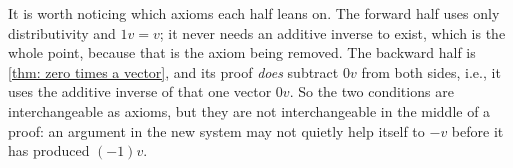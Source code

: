 \begin{ainote}
  It is worth noticing which axioms each half leans on. The forward half uses only distributivity and $1v = v$; it never needs an additive inverse to exist, which is the whole point, because that is the axiom being removed. The backward half is \ref{thm: zero times a vector}, and its proof \emph{does} subtract $0v$ from both sides, i.e., it uses the additive inverse of that one vector $0v$. So the two conditions are interchangeable as axioms, but they are not interchangeable in the middle of a proof: an argument in the new system may not quietly help itself to $-v$ before it has produced $(-1)v$.
\end{ainote}
